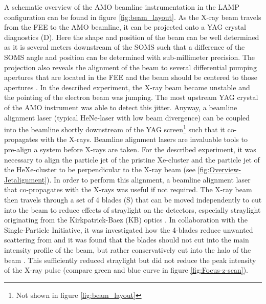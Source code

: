 A schematic overview of the AMO beamline instrumentation in the LAMP configuration can be found in figure \ref{fig:beam_layout}. As the X-ray beam travels from the FEE to the AMO beamline, it can be projected onto a YAG crystal diagnostics (D). Here the shape and position of the beam can be well determined as it is several meters downstream of the SOMS such that a difference of the SOMS angle and position can be determined with sub-millimeter precision. The projection also reveals the alignment of the beam to several differential pumping apertures that are located in the FEE and the beam should be centered to those apertures \citep{Turner-2016-PC}. In the described experiment, the X-ray beam became unstable and the pointing of the electron beam was jumping. The most upstream YAG crystal of the AMO instrument was able to detect this jitter. Anyway, a beamline alignment laser (typical HeNe-laser with low beam divergence) can be coupled into the beamline shortly downstream of the YAG screen\footnote{Not shown in  figure \ref{fig:beam_layout}} such that it co-propagates with the X-rays. Beamline alignment lasers are invaluable tools to pre-align a system before X-rays are taken. For the described experiment, it was necessary to align the particle jet of the pristine Xe-cluster and the particle jet of the HeXe-cluster to be perpendicular to the X-ray beam (see \ref{fig:Overview-Jetalignment}). In order to perform this alignment, a beamline alignment laser that co-propagates with the X-rays was useful if not required. The X-ray beam then travels through a set of 4 blades (S) that can be moved independently to cut into the beam to reduce effects of straylight on the detectors, especially straylight originating from the Kirkpatrick-Baez (KB) optics \citep{Kirkpatrick-1948-JOSA}. In collaboration with the Single-Particle Initiative, it was investigated how the 4-blades reduce unwanted scattering from and it was found that the blades should not cut into the main intensity profile of the beam, but rather conservatively cut into the halo of the beam \citep{SPI-2015-unpublished}. This sufficiently reduced straylight but did not reduce the peak intensity of the X-ray pulse (compare green and blue curve in figure \ref{fig:Focus-z-scan}).
